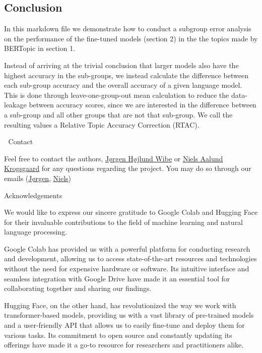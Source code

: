 \documentclass[
]{article}
\begin{document}
\hypertarget{conclusion-2}{%
\subsection{Conclusion}\label{conclusion-2}}

In this markdown file we demonstrate how to conduct a subgroup error
analysis on the performance of the fine-tuned models (section 2) in the
the topics made by BERTopic in section 1.

Instead of arriving at the trivial conclusion that larger models also
have the highest accuracy in the sub-groups, we instead calculate the
difference between each sub-group accuracy and the overall accuracy of a
given language model. This is done through leave-one-group-out mean
calculation to reduce the data-leakage between accuracy scores, since we
are interested in the difference between a sub-group and all other
groups that are not that sub-group. We call the resulting values a
Relative Topic Accuracy Correction (RTAC).

💬 Contact 💬

Feel free to contact the authors,
\href{https://github.com/jorgenhw}{Jørgen Højlund Wibe} or
\href{https://github.com/nielsaak}{Niels Aalund Krogsgaard} for any
questions regarding the project. You may do so through our emails
(\href{mailto:201807750@post.au.dk}{Jørgen},
\href{mailto:202008114@post.au.dk}{Niels})

Acknowledgements

We would like to express our sincere gratitude to Google Colab and
Hugging Face for their invaluable contributions to the field of machine
learning and natural language processing.

Google Colab has provided us with a powerful platform for conducting
research and development, allowing us to access state-of-the-art
resources and technologies without the need for expensive hardware or
software. Its intuitive interface and seamless integration with Google
Drive have made it an essential tool for collaborating together and
sharing our findings.

Hugging Face, on the other hand, has revolutionized the way we work with
transformer-based models, providing us with a vast library of
pre-trained models and a user-friendly API that allows us to easily
fine-tune and deploy them for various tasks. Its commitment to open
source and constantly updating its offerings have made it a go-to
resource for researchers and practitioners alike.
\end{document}
